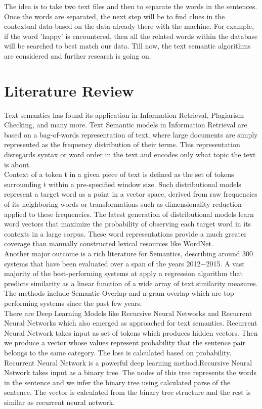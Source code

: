 \documentclass[journal, a4paper]{IEEEtran}
\begin{document}
	The idea is to take two text files and then to separate the words in the sentences. Once the words are separated, the next step will be to find clues in the contextual data based on the data already there with the machine. For example, if the word 'happy' is encountered, then all the related words within the database will be searched to best match our data. Till now, the text semantic algorithms are considered and further research is going on. 
	
\section{Literature Review}
Text semantics has found its application in Information Retrieval, Plagiarism Checking, and many more. Text Semantic models in Information Retrieval are based on a bag-of-words representation of text, where large documents are simply represented as the frequency distribution of their terms. This representation disregards syntax or word order in the text and encodes only what topic the text is about. \\
Context of a token t in a given piece of text is defined as the set of tokens surrounding t within a pre-specified window size. Such distributional models represent a target word as a point in a vector space, derived from raw frequencies of its neighboring words or transformations such as dimensionality reduction applied to these frequencies. The latest generation of distributional models learn
word vectors that maximize the probability of observing each target word in its contexts in a large corpus. These word representations provide a much greater coverage than manually constructed lexical resources like WordNet. \\
Another major outcome is a rich literature for Semantics, describing around 300 systems that have been evaluated over a span of the years 2012$ - $2015. A vast majority of the best-performing systems at apply a regression algorithm that predicts similarity as a linear function of a wide array of text similarity measures. The methods include Semantic Overlap and n-gram overlap which are top-performing systems since the past few years. \\
There are Deep Learning Models like Recursive Neural Networks and Recurrent Neural Networks which also emerged as approached for text semantics. Recurrent Neural Network takes input as set of tokens which produces hidden vectors. Then we produce a vector whose values represent probability that the sentence pair belongs to the same category. The loss is calculated based on probability. Recurrent Neural Network is a powerful deep learning method.Recursive Neural Network takes input as a binary tree. The nodes of this tree represents the words in the sentence and we infer the binary tree using calculated parse of the sentence. The vector is calculated from the binary tree structure and the rest is similar as recurrent neural network. 
\end{document}
